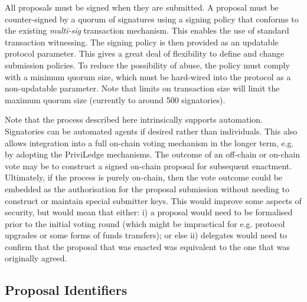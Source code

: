 All proposals must be signed when they are submitted.  A proposal must be counter-signed by a quorum of signatures using a signing
policy that conforms to the existing \emph{multi-sig} transaction mechanism.  This enables the use of standard transaction witnessing.
The signing policy is then provided as an updatable protocol parameter.  This gives a great deal of flexibility to define and change submission policies.
To reduce the possibility of abuse, the policy must comply with a minimum quorum size, which must be hard-wired into the protocol as a non-updatable
parameter.
Note that limits on transaction size will limit the maximum quorum size (currently to around 500 signatories).



Note that the process described here intrinsically supports automation.  Signatories can be automated agents if desired rather than individuals.  This also allows integration into a full on-chain voting mechanism in the longer term, e.g. by adopting the PriviLedge mechanisms.  The outcome of an off-chain or on-chain vote may be to construct a signed on-chain proposal for subsequent enactment.  Ultimately, if the process is purely on-chain, then the vote outcome could be embedded as the authorisation for the proposal submission without needing to construct or maintain special submitter keys.  This would improve some aspects of security, but would mean that either: i) a proposal would need to be formalised prior to the initial voting round (which might be impractical for e.g. protocol upgrades or some forms of funds transfers); or else ii) delegates would need to confirm that the proposal that was enacted was equivalent to the one that was originally agreed.


\subsection{Proposal Identifiers}
\label{sect:proposalid}

